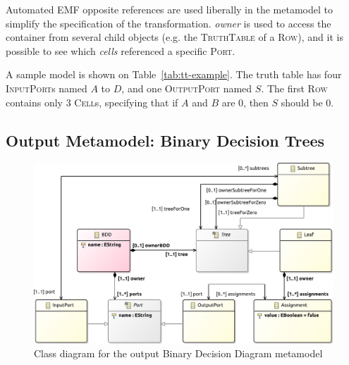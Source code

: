 \documentclass[a4paper]{scrartcl}
\newcommand*{\class}[1]{\textsc{#1}}
\newcommand*{\feature}[1]{\emph{#1}}
\begin{document}
Automated EMF opposite references are used liberally in the metamodel to
simplify the specification of the transformation. \feature{owner} is used to
access the container from several child objects (e.g. the \class{Truth\-Table}
of a \class{Row}), and it is possible to see which \feature{cells} referenced a
specific \class{Port}.

A sample model is shown on Table~\ref{tab:tt-example}. The truth table has four
\class{Input\-Port}s named $A$ to $D$, and one \class{Output\-Port} named $S$.
The first \class{Row} contains only 3 \class{Cell}s, specifying that if $A$ and
$B$ are 0, then $S$ should be 0.

\subsection{Output Metamodel: Binary Decision Trees}
\label{sec:outp-metam-binary}

\begin{figure}
  \centering
  \includegraphics[width=.9\textwidth]{bdd}
  \caption{Class diagram for the output Binary Decision Diagram metamodel}
  \label{fig:bdd-metamodel}
\end{figure}
\end{document}
